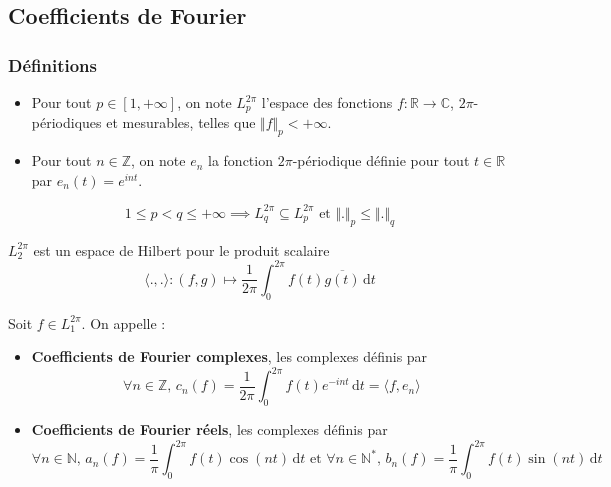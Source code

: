 




  \subsection{Coefficients de Fourier}

  \subsubsection{Définitions}


  \begin{notation}
    \begin{itemize}
      \item Pour tout $p \in [1, +\infty]$, on note $L_p^{2\pi}$ l'espace des fonctions $f : \mathbb{R} \rightarrow \mathbb{C}$, $2\pi$-périodiques et mesurables, telles que $\Vert f \Vert_p < +\infty$.
      \item Pour tout $n \in \mathbb{Z}$, on note $e_n$ la fonction $2\pi$-périodique définie pour tout $t \in \mathbb{R}$ par $e_n(t) = e^{int}$.
    \end{itemize}
  \end{notation}

  \begin{remark}
    \[ 1 \leq p < q \leq +\infty \implies L_q^{2\pi} \subseteq L_p^{2\pi} \text{ et } \Vert . \Vert_p \leq \Vert . \Vert_q \]
  \end{remark}

  \begin{proposition}
    $L_2^{2\pi}$ est un espace de Hilbert pour le produit scalaire
    \[ \langle ., . \rangle : (f, g) \mapsto \frac{1}{2 \pi} \int_0^{2\pi} f(t) \overline{g(t)} \, \mathrm{d}t \]
  \end{proposition}


  \begin{definition}
    Soit $f \in L_1^{2\pi}$. On appelle :
    \begin{itemize}
      \item \textbf{Coefficients de Fourier complexes}, les complexes définis par
      \[ \forall n \in \mathbb{Z}, \, c_n(f) = \frac{1}{2 \pi} \int_0^{2\pi} f(t) e^{-int} \, \mathrm{d}t = \langle f, e_n \rangle \]
      \item \textbf{Coefficients de Fourier réels}, les complexes définis par
      \[ \forall n \in \mathbb{N}, \, a_n(f) = \frac{1}{\pi} \int_0^{2\pi} f(t) \cos(nt) \, \mathrm{d}t \text{ et } \forall n \in \mathbb{N}^*, \, b_n(f) = \frac{1}{\pi} \int_0^{2\pi} f(t) \sin(nt) \, \mathrm{d}t \]
    \end{itemize}
  \end{definition}

